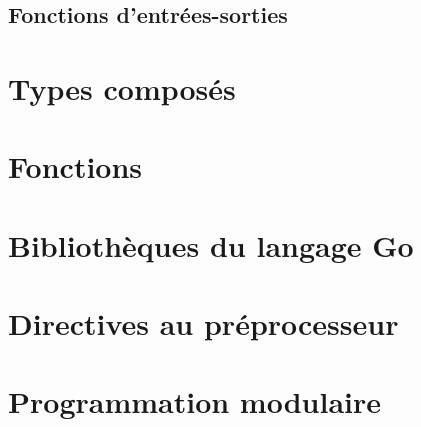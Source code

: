 \documentclass[11pt]{article}
\begin{document}
\subsection{Fonctions d'entrées-sorties}

\section{Types composés}

\section{Fonctions}

\section{Bibliothèques du langage Go}

\section{Directives au préprocesseur}

\section{Programmation modulaire}
\end{document}
